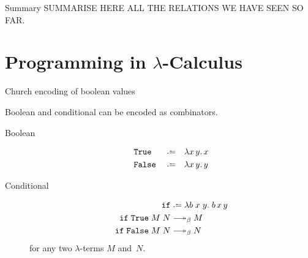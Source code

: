 \begin{frame}{Summary}
  SUMMARISE HERE ALL THE RELATIONS WE HAVE SEEN SO FAR.
\end{frame}

\section{Programming in \texorpdfstring{$\lambda$}{λ}-Calculus}
\begin{frame}{Church encoding of boolean values}
  
Boolean and conditional can be encoded as combinators.
  
\begin{description}
  \item[Boolean]
    \begin{align*}
      & \mathtt{True}  && \defeq && \lambda x\,y.\, x \\
      & \mathtt{False} && \defeq && \lambda x\,y.\, y
    \end{align*}

  \item[Conditional]
    \begin{align*}
      \mathtt{if} & \defeq \lambda b\;x\;y.\;b\,x\,y  \\
      \mathtt{if} \;\mathtt{True} \;M\;N &\reduce M \\
      \mathtt{if} \;\mathtt{False}\;M\;N &\reduce N
    \end{align*}
    for any two $\lambda$-terms $M$ and~$N$.
\end{description}

\end{frame}
